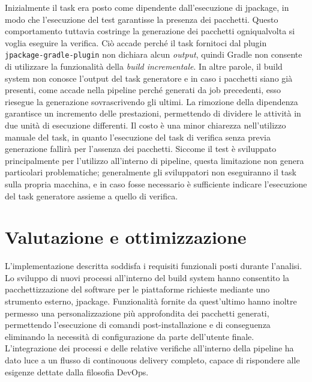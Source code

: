 

Inizialmente il task era posto come dipendente dall'esecuzione di jpackage, in modo che l'esecuzione del test garantisse la presenza dei pacchetti. Questo comportamento tuttavia costringe la generazione dei pacchetti ogniqualvolta si voglia eseguire la verifica. Ciò accade perché il task fornitoci dal plugin \texttt{jpackage-gradle-plugin} non dichiara alcun \textit{output}, quindi Gradle non consente di utilizzare la funzionalità della \textit{build incrementale}. In altre parole, il build system non conosce l'output del task generatore e in caso i pacchetti siano già presenti, come accade nella pipeline perché generati da job precedenti, esso riesegue la generazione sovrascrivendo gli ultimi. La rimozione della dipendenza garantisce un incremento delle prestazioni, permettendo di dividere le attività in due unità di esecuzione differenti. Il costo è una minor chiarezza nell'utilizzo manuale del task, in quanto l'esecuzione del task di verifica senza previa generazione fallirà per l'assenza dei pacchetti. Siccome il test è sviluppato principalmente per l'utilizzo all'interno di pipeline, questa limitazione non genera particolari problematiche; generalmente gli sviluppatori non eseguiranno il task sulla propria macchina, e in caso fosse necessario è sufficiente indicare l'esecuzione del task generatore assieme a quello di verifica.

\section{Valutazione e ottimizzazione}

L'implementazione descritta soddisfa i requisiti funzionali posti durante l'analisi. Lo sviluppo di nuovi processi all'interno del build system hanno consentito la pacchettizzazione del software per le piattaforme richieste mediante uno strumento esterno, jpackage. Funzionalità fornite da quest'ultimo hanno inoltre permesso una personalizzazione più approfondita dei pacchetti generati, permettendo l'esecuzione di comandi post-installazione e di conseguenza eliminando la necessità di configurazione da parte dell'utente finale. L'integrazione dei processi e delle relative verifiche all'interno della pipeline ha dato luce a un flusso di continouous delivery completo, capace di rispondere alle esigenze dettate dalla filosofia DevOps.

